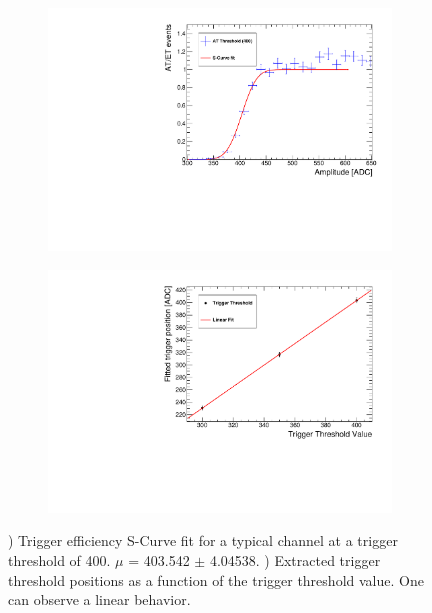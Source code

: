 \begin{figure}[htbp!]
  \centering
  \begin{subfigure}[t]{0.49\textwidth}
    \includegraphics[width=1.\linewidth]{../Thesis_Plots/Commissioning/Plots/EfficiencyCurveFit_HBU2_12.pdf}
    \caption{} \label{fig:EffiCurve}
  \end{subfigure}
  \hfill
  \begin{subfigure}[t]{0.49\textwidth}
    \includegraphics[width=1.\linewidth]{../Thesis_Plots/Commissioning/Plots/TriggerThresholdFit_HBU2_12.pdf}
    \caption{} \label{fig:TriggerFit}
  \end{subfigure}
  \caption{) Trigger efficiency S-Curve fit for a typical channel at a trigger threshold of 400. $\mu$ = 403.542 $\pm$ 4.04538. ) Extracted trigger threshold positions as a function of the trigger threshold value. One can observe a linear behavior.}
\end{figure}


